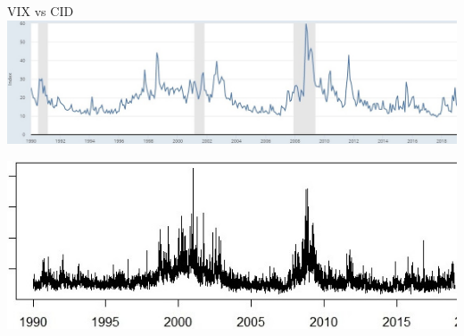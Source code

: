 \documentclass{beamer}
\begin{document}
\begin{frame}{VIX vs CID}
\includegraphics[width=1\textwidth]{vix_90.jpg}

\includegraphics[width=1\textwidth]{ts_cid_90_01.jpg}
\end{frame}
\end{document}
